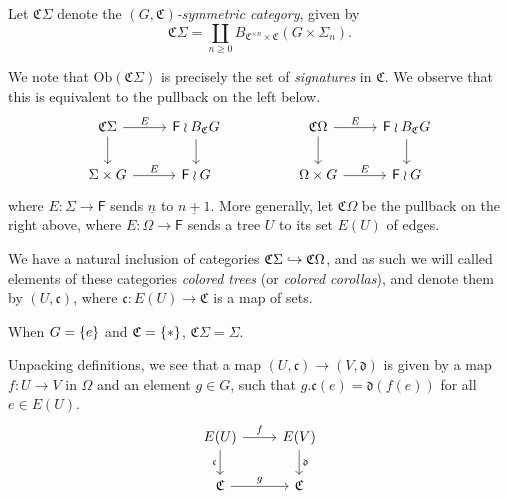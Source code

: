\documentclass[a4paper,10pt
]{article}%
\renewcommand{\1}{\ensuremath{\mathbb{id}}}
\begin{document}
\begin{definition}
      Let $\mathfrak C \Sigma$ denote the \textit{$(G,\mathfrak C)$-symmetric category}, given by
      \begin{equation}
            \mathfrak C \Sigma = \coprod\limits_{n\geq 0} B_{\mathfrak C^{\times n} \times \mathfrak C}(G \times \Sigma_n).
      \end{equation}
      
      We note that $\mathrm{Ob}(\mathfrak C \Sigma)$ is precisely the set of \textit{signatures} in $\mathfrak C$.
      We observe that this is equivalent to the pullback on the left below.
      \begin{equation}
            \label{COMEGA_B_EQ}
            \begin{tikzcd}
                  \mathfrak C \Sigma \arrow[d] \arrow[r, "E"]
                  &
                  \mathsf F \wr B_{\mathfrak C}G \arrow[d]
                  &&
                  \mathfrak C \Omega \arrow[d] \arrow[r, "E"]
                  &
                  \mathsf F \wr B_{\mathfrak C}G \arrow[d]
                  \\
                  \Sigma \times G \arrow[r, "E"]
                  &
                  \mathsf F \wr G
                  &&
                  \Omega \times G \arrow[r, "E"]
                  &
                  \mathsf F \wr G
            \end{tikzcd}
      \end{equation}
      where $E: \Sigma \to \mathsf F$ sends $\underline{n}$ to $\underline{n+1}$.
      More generally, let $\mathfrak C \Omega$ be the pullback on the right above,
      where $E: \Omega \to \mathsf F$ sends a tree $U$ to its set $E(U)$ of edges.

      We have a natural inclusion of categories $\mathfrak C \Sigma \hookrightarrow \mathfrak C \Omega$,
      and as such we will called elements of these categories
      \textit{colored trees} (or \textit{colored corollas}),
      and denote them by $(U,\mathfrak c)$, where $\mathfrak c: E(U) \to \mathfrak C$ is a map of sets.
\end{definition}

\begin{remark}
      When $G = \left\{e\right\}$ and $\mathfrak C = \left\{*\right\}$, $\mathfrak C \Sigma = \Sigma$.
\end{remark}

Unpacking definitions, we see that a map $(U, \mathfrak c) \to (V, \mathfrak d)$ is given by
a map $f: U \to V$ in $\Omega$ and an element $g\in G$,
such that $g.\mathfrak c(e) = \mathfrak d(f(e))$ for all $e \in E(U)$.
\begin{equation}
      \begin{tikzcd}
            E(U) \arrow[r, "f"] \arrow[d, "\mathfrak c"']
            &
            E(V) \arrow[d, "\mathfrak d"]
            \\
            \mathfrak C \arrow[r, "g"]
            &
            \mathfrak C
      \end{tikzcd}
\end{equation}
\end{document}
